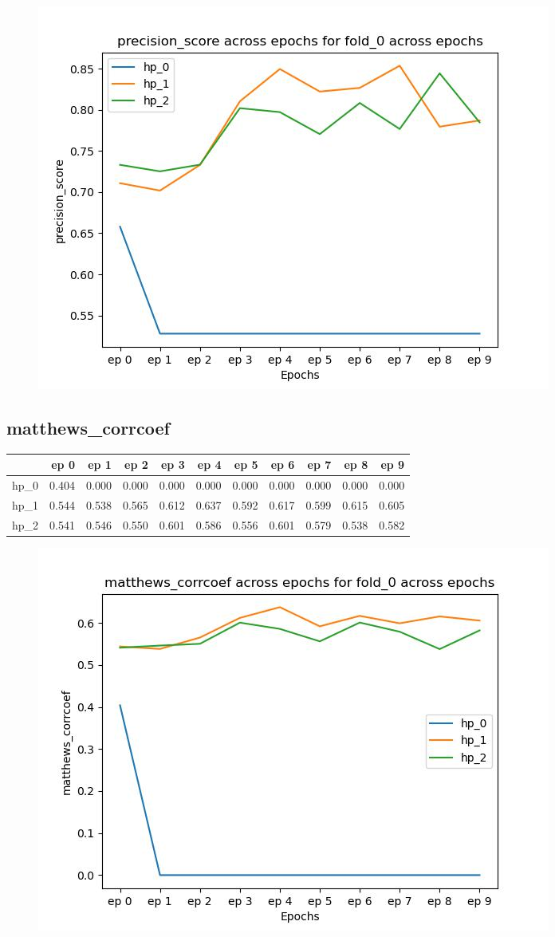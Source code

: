 \documentclass{article}
\begin{document}
\begin{figure}[H]
\includegraphics[scale = 0.75]{fold_0/precision_score}
\end{figure}
\subsection{matthews\_corrcoef}
\begin{tabular}{lrrrrrrrrrr}
\toprule
{} &   ep 0 &   ep 1 &   ep 2 &   ep 3 &   ep 4 &   ep 5 &   ep 6 &   ep 7 &   ep 8 &   ep 9 \\
\midrule
hp\_0 &  0.404 &  0.000 &  0.000 &  0.000 &  0.000 &  0.000 &  0.000 &  0.000 &  0.000 &  0.000 \\
hp\_1 &  0.544 &  0.538 &  0.565 &  0.612 &  0.637 &  0.592 &  0.617 &  0.599 &  0.615 &  0.605 \\
hp\_2 &  0.541 &  0.546 &  0.550 &  0.601 &  0.586 &  0.556 &  0.601 &  0.579 &  0.538 &  0.582 \\
\bottomrule
\end{tabular}

\begin{figure}[H]
\includegraphics[scale = 0.75]{fold_0/matthews_corrcoef}
\end{figure}
\end{document}
